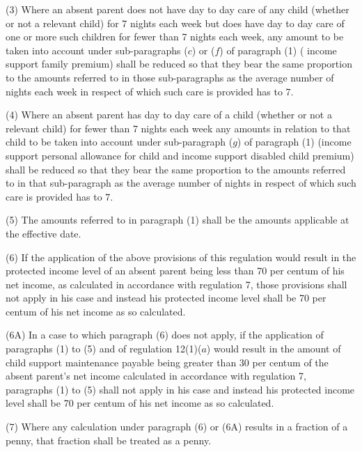 \documentclass[a4paper]{article}
\begin{document}
(3) Where an absent parent does not have day to day care of any child (whether or not a relevant child) for 7 nights each week but does have day to day care of one or more such children for fewer than 7 nights each week, 
any amount  %
to be taken into account under sub-paragraphs ($c$) 
or ($f$)  %
of paragraph (1) (%
income support family premium) shall be reduced so that they bear the same proportion to the amounts referred to in those sub-paragraphs as the average number of nights each week in respect of which such care is provided has to 7.

(4) Where an absent parent has day to day care of a child (whether or not a relevant child) for fewer than 7 nights each week any amounts in relation to that child to be taken into account under sub-paragraph ($g$) of paragraph (1) (income support personal allowance for child and income support disabled child premium) shall be reduced so that they bear the same proportion to the amounts referred to in that sub-paragraph as the average number of nights in respect of which such care is provided has to 7.

(5) The amounts referred to in paragraph (1) shall be the amounts applicable at the effective date.

(6) If the application of the above provisions of this regulation would result in the protected income level of an absent parent being less than 70 per centum of his net income, as calculated in accordance with regulation 7, those provisions shall not apply in his case and instead his protected income level shall be 70 per centum of his net income as so calculated.

(6A) In a case to which paragraph (6) does not apply, if the application of paragraphs (1) to (5) and of regulation 12(1)($a$) would result in the amount of child support maintenance payable being greater than 30 per centum of the absent parent’s net income calculated in accordance with regulation 7, paragraphs (1) to (5) shall not apply in his case and instead his protected income level shall be 70 per centum of his net income as so calculated.

(7) Where any calculation under paragraph (6) 
or (6A)  %
results in a fraction of a penny, that fraction shall be treated as a penny.
\end{document}
